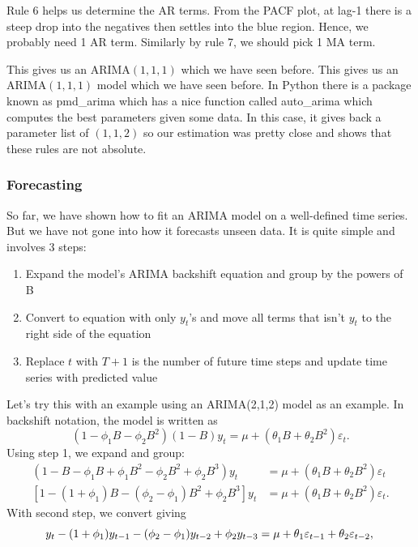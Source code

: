 \documentclass{article}
\begin{document}
  Rule 6 helps us determine the AR terms. From the PACF plot, at lag-1 there is a steep drop into the negatives then settles into the blue region. Hence, we probably need 1 AR term. Similarly by rule 7, we should pick 1 MA term.

  This gives us an ARIMA$(1,1,1)$ which we have seen before. This gives us an ARIMA$(1,1,1)$ model which we have seen before. In Python there is a package known as pmd\_arima which has a nice function called auto\_arima which computes the best parameters given some data. In this case, it gives back a parameter list of $(1,1,2)$ so our estimation was pretty close and shows that these rules are not absolute.
  

  \subsubsection{Forecasting}
  So far, we have shown how to fit an ARIMA model on a well-defined time series. But we have not gone into how it forecasts unseen data. It is quite simple and involves 3 steps:
  \begin{enumerate}
    \item Expand the model's ARIMA backshift equation and group by the powers of B
    \item Convert to equation with only $y_t$'s and move all terms that isn't $y_t$ to the right side of the equation
    \item Replace $t$ with $T+1$ is the number of future time steps and update time series with predicted value
  \end{enumerate}
  Let's try this with an example using an ARIMA(2,1,2) model as an example. In backshift notation, the model is written as
  \begin{equation*}
    (1 - \phi_1B - \phi_2B^2)(1-B)y_t = \mu + (\theta_1B + \theta_2B^2)\varepsilon_t.
  \end{equation*}
  Using step 1, we expand and group:
  \begin{align*}
    (1 - B - \phi_1B + \phi_1B^2 - \phi_2B^2 + \phi_2B^3)y_t &= \mu + (\theta_1B + \theta_2B^2)\varepsilon_t\\
    [1 - (1 + \phi_1)B - (\phi_2 - \phi_1)B^2 + \phi_2B^3]y_t &= \mu + (\theta_1B + \theta_2B^2)\varepsilon_t.
  \end{align*}
  With second step, we convert giving
  \begin{equation*}
    y_t - (1 + \phi_1)y_{t-1} - (\phi_2 - \phi_1)y_{t-2} + \phi_2y_{t-3} = \mu + \theta_1\varepsilon_{t-1} + \theta_2\varepsilon_{t-2},\\
  \end{equation*}
\end{document}

